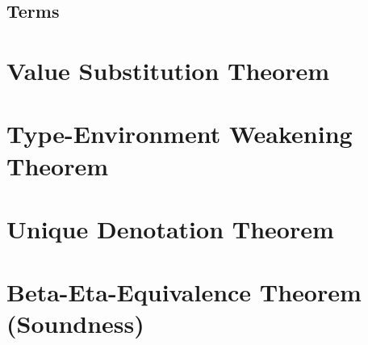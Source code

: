 \documentclass{report}
\begin{document}
\section{Terms}

\chapter{Value Substitution Theorem}

\chapter{Type-Environment Weakening Theorem}

\chapter{Unique Denotation Theorem}

\chapter{Beta-Eta-Equivalence Theorem (Soundness)}


    
\end{document}
